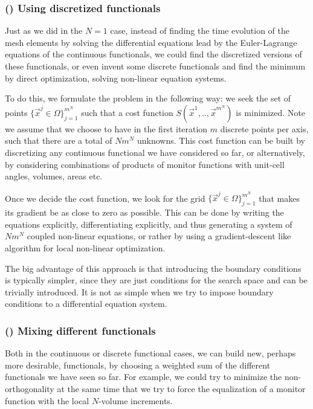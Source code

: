 \documentclass[11pt, a4paper]{article} %
\begin{document}
\subsubsection*{\bf (\textdelta) Using discretized functionals}

Just as we did in the $N=1$ case, instead of finding the time evolution of the mesh elements by solving the differential equations lead by the Euler-Lagrange equations of the continuous functionals, we could find the discretized versions of these functionals, or even invent some discrete functionals and find the minimum by direct optimization, solving non-linear equation systems.

To do this, we formulate the problem in the following way: we seek the set of points $\{\vec{x}^j\in \Omega\}_{j=1}^{m^N}$ such that a cost function $S(\vec{x}^1,..,\vec{x}^{m^N})$ is minimized. Note we assume that we choose to have in the first iteration $m$ discrete points per axis, such that there are a total of $Nm^N$ unknowns. This cost function can be built by discretizing any continuous functional we have considered so far, or alternatively, by considering combinations of products of monitor functions with unit-cell angles, volumes, areas etc. 

Once we decide the cost function, we look for the grid $\{\vec{x}^j\in \Omega\}_{j=1}^{m^N}$ that makes its gradient be as close to zero as possible. This can be done by writing the equations explicitly, differentiating explicitly, and thus generating a system of $Nm^N$ coupled non-linear equations, or rather by using a gradient-descent like algorithm for local non-linear optimization.

The big advantage of this approach is that introducing the boundary conditions is typically simpler, since they are just conditions for the search space and can be trivially introduced. It is not as simple when we try to impose boundary conditions to a differential equation system.

\subsubsection*{\bf (\textepsilon) Mixing different functionals}
Both in the continuous or discrete functional cases, we can build new, perhaps more desirable, functionals, by choosing a weighted sum of the different functionals we have seen so far. For example, we could try to minimize the non-orthogonality at the same time that we try to force the equalization of a monitor function with the local $N$-volume increments.
\end{document}
